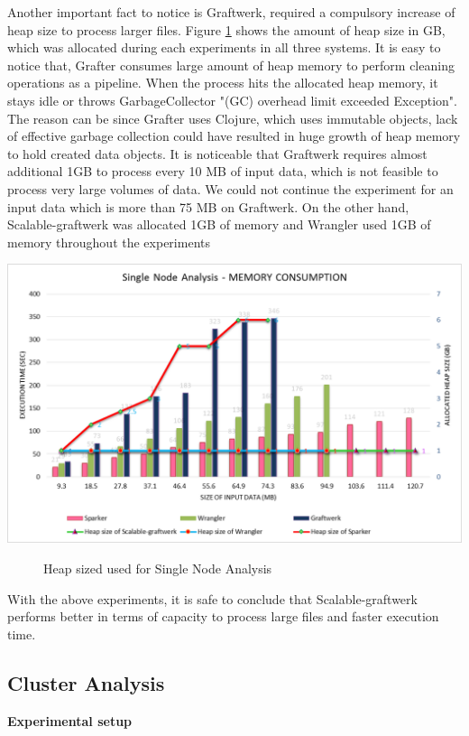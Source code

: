 Another important fact to notice is Graftwerk, required a compulsory increase of heap size to process larger files. Figure \ref{fig:heapsize} shows the amount of heap size in GB, which was allocated during each experiments in all three systems. It is easy to notice that, Grafter consumes large amount of heap memory to perform cleaning operations as a pipeline. When the process hits the allocated heap memory, it stays idle or throws GarbageCollector "(GC) overhead limit exceeded Exception". The reason can be since Grafter uses Clojure, which uses immutable objects, lack of effective garbage collection could have resulted in huge growth of heap memory to hold created data objects. It is noticeable that Graftwerk requires almost additional 1GB to process every 10 MB of input data, which is not feasible to process very large volumes of data. We could not continue the experiment for an input data which is more than 75 MB on Graftwerk. On the other hand, Scalable-graftwerk was allocated 1GB of memory and Wrangler used 1GB of memory throughout the experiments
\begin{center}
	\includegraphics[width=38em]{./Figures/heapsize2}
	\begin{figure}[htbp]
    \caption{Heap sized used for Single Node Analysis}
    \label{fig:heapsize}
	\end{figure}
\end{center}
With the above experiments, it is safe to conclude that Scalable-graftwerk performs better in terms of capacity to process large files and faster execution time. 
\subsection{Cluster Analysis}
\textbf{Experimental setup}

